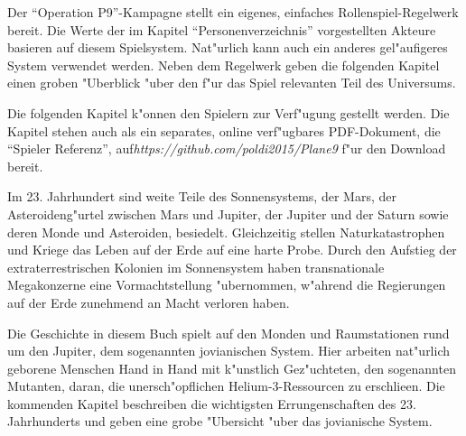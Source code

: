 
Der ``Operation P9''-Kampagne stellt ein eigenes, einfaches Rollenspiel-Regelwerk bereit. Die Werte der im Kapitel ``Personenverzeichnis'' vorgestellten Akteure basieren auf diesem Spielsystem. Nat"urlich kann auch ein anderes gel"aufigeres System verwendet werden. Neben dem Regelwerk geben die folgenden Kapitel einen groben "Uberblick "uber den f"ur das Spiel relevanten Teil des Universums.

\begin{remarks}
    Die folgenden Kapitel k"onnen den Spielern zur Verf"ugung gestellt werden. Die Kapitel stehen auch als ein separates, online verf"ugbares PDF-Dokument, die ``Spieler Referenz'', auf\newline{}\textit{https://github.com/poldi2015/Plane9} f"ur den Download bereit.
\end{remarks}


Im 23. Jahrhundert sind weite Teile des Sonnensystems, der Mars, der Asteroideng"urtel zwischen Mars und Jupiter, der Jupiter und der Saturn sowie deren Monde und Asteroiden, besiedelt. Gleichzeitig stellen Naturkatastrophen und Kriege das Leben auf der Erde auf eine harte Probe. Durch den Aufstieg der extraterrestrischen Kolonien im Sonnensystem haben transnationale Megakonzerne eine Vormachtstellung "ubernommen, w"ahrend die Regierungen auf der Erde zunehmend an Macht verloren haben.

Die Geschichte in diesem Buch spielt auf den Monden und Raumstationen rund um den Jupiter, dem sogenannten jovianischen System. Hier arbeiten nat"urlich geborene Menschen Hand in Hand mit k"unstlich Gez"uchteten, den sogenannten Mutanten, daran, die unersch"opflichen Helium-3-Ressourcen zu erschlie\3en. Die kommenden Kapitel beschreiben die wichtigsten Errungenschaften des 23. Jahrhunderts und geben eine grobe "Ubersicht "uber das jovianische System.




